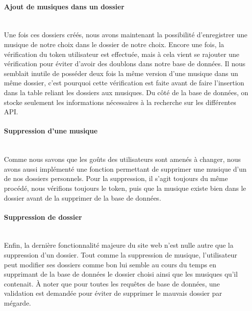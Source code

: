 \documentclass[12pt,french]{article}
\begin{document}
\paragraph{Ajout de musiques dans un dossier \\\\} 

Une fois ces dossiers créés, nous avons maintenant la possibilité d'enregistrer une musique de notre choix dans le dossier de notre choix. Encore une fois, la vérification du \gls{token} utilisateur est effectuée, mais à cela vient se rajouter une vérification pour éviter d'avoir des doublons dans notre base de données. Il nous semblait inutile de posséder deux fois la même version d'une musique dans un même dossier, c'est pourquoi cette vérification est faite avant de faire l'insertion dans la \gls{table} reliant les dossiers aux musiques. Du côté de la base de données, on stocke seulement les informations nécessaires à la recherche sur les différentes \gls{API}.

\paragraph{Suppression d'une musique \\\\}

Comme nous savons que les goûts des utilisateurs sont amenés à changer, nous avons aussi implémenté une fonction permettant de supprimer une musique d'un de nos dossiers personnels. Pour la suppression, il s'agit toujours du même procédé, nous vérifions toujours le \gls{token}, puis que la musique existe bien dans le dossier avant de la supprimer de la base de données.

\paragraph{Suppression de dossier \\\\}

Enfin, la dernière fonctionnalité majeure du site web n'est nulle autre que la suppression d'un dossier. Tout comme la suppression de musique, l'utilisateur peut modifier ses dossiers comme bon lui semble au cours du temps en supprimant de la base de données le dossier choisi ainsi que les musiques qu'il contenait. À noter que pour toutes les requêtes de base de données, une validation est demandée pour éviter de supprimer le mauvais dossier par mégarde.
\end{document}
